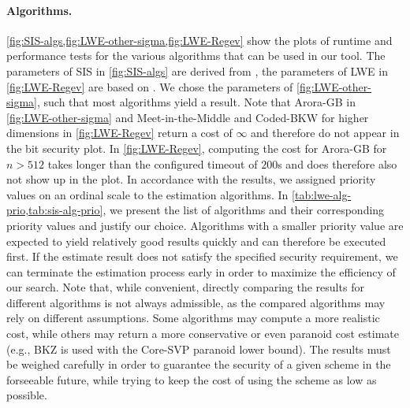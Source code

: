 \paragraph{Algorithms.} \label{sec:tool-algorithms} \cref{fig:SIS-algs,fig:LWE-other-sigma,fig:LWE-Regev} show the plots of runtime and performance tests for the various algorithms that can be used in our tool. The parameters of SIS in \cref{fig:SIS-algs} are derived from \cite{MP12}, the parameters of LWE in \cref{fig:LWE-Regev} are based on \cite{Reg05}. We chose the parameters of \cref{fig:LWE-other-sigma}, such that most algorithms yield a result. Note that Arora-GB in \cref{fig:LWE-other-sigma} and Meet-in-the-Middle and Coded-BKW for higher dimensions in \cref{fig:LWE-Regev} return a cost of $\infty$ and therefore do not appear in the bit security plot. In \cref{fig:LWE-Regev}, computing the cost for Arora-GB for $n>512$ takes longer than the configured timeout of $200$s and does therefore also not show up in the plot. In accordance with the results, we assigned priority values on an ordinal scale to the estimation algorithms. In \cref{tab:lwe-alg-prio,tab:sis-alg-prio}, we present the list of algorithms and their corresponding priority values and justify our choice. Algorithms with a smaller priority value are expected to yield relatively good results quickly and can therefore be executed first. If the estimate result does not satisfy the specified security requirement, we can terminate the estimation process early in order to maximize the efficiency of our search. Note that, while convenient, directly comparing the results for different algorithms is not always admissible, as the compared algorithms may rely on different assumptions. Some algorithms may compute a more realistic cost, while others may return a more conservative or even paranoid cost estimate (e.g., BKZ is used with the Core-SVP paranoid lower bound). The results must be weighed carefully in order to guarantee the security of a given scheme in the forseeable future, while trying to keep the cost of using the scheme as low as possible. %
